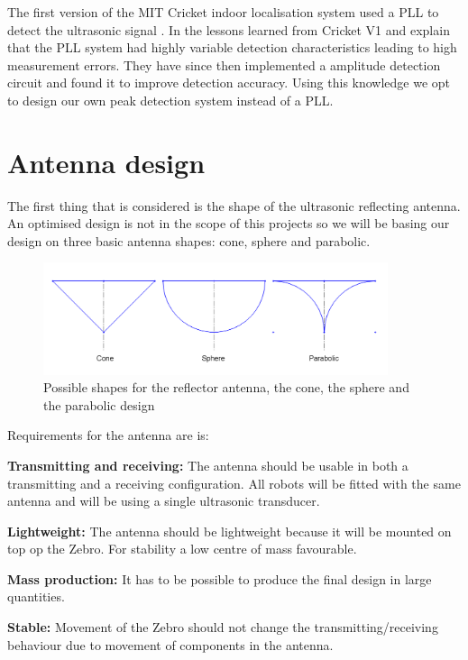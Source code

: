 The first version of the MIT Cricket indoor localisation system used a PLL to detect the ultrasonic signal \cite{Priyantha2000}.
In \cite{Balakrishnan2003} the lessons learned from Cricket V1 and explain that the PLL system had highly variable detection characteristics leading to high measurement errors.
They have since then implemented a amplitude detection circuit and found it to improve detection accuracy.
Using this knowledge we opt to design our own peak detection system instead of a PLL.

\section{Antenna design}
The first thing that is considered is the shape of the ultrasonic reflecting antenna. An optimised design is not in the scope of this projects so we will be basing our design on three basic antenna shapes: cone, sphere and parabolic.

\begin{figure}[H]
\centering
\includegraphics[width=0.9\textwidth]{Figures/ant_shapes.PNG}
\caption{Possible shapes for the reflector antenna, the cone, the sphere and the parabolic design}
\label{fig:shapes}
\end{figure}

Requirements for the antenna are is:

\begin{enumerate}[label={[A.\arabic*]}]
  \item
  \textbf{Transmitting and receiving:} The antenna should be usable in both a transmitting and a receiving configuration. All robots will be fitted with the same antenna and will be using a single ultrasonic transducer. \label{ref:T_R}
  \item\label{ref:a2}
  \textbf{Lightweight:} The antenna should be lightweight because it will be mounted on top op the Zebro. For stability a low centre of mass favourable.
  \item\label{ref:a3}
  \textbf{Mass production:} It has to be possible to produce the final design in large quantities.
  \item
  \textbf{Stable:} Movement of the Zebro should not change the transmitting/receiving behaviour due to movement of components in the antenna.
\end{enumerate}

